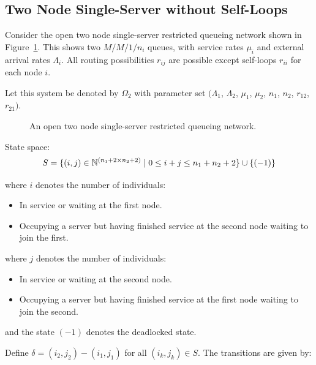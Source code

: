 \documentclass{article}
\begin{document}
\subsection{Two Node Single-Server without Self-Loops}\label{sec:2nodewithoutselfloops}

Consider the open two node single-server restricted queueing network shown in Figure~\ref{fig:queueingnetwork_2nodes}.
This shows two \(M/M/1/n_i\) queues, with service rates $\mu_i$ and external arrival rates $\Lambda_i$.
All routing possibilities $r_{ij}$ are possible except self-loops $r_{ii}$ for each node $i$.

Let this system be denoted by $\Omega_2$ with parameter set $(\Lambda_1$, $\Lambda_2$, $\mu_1$, $\mu_2$, $n_1$, $n_2$, $r_{12}$, $r_{21})$.

\begin{figure}[!htbp]
  \begin{center}
  
  \end{center}
  \caption{An open two node single-server restricted queueing network.}
  \label{fig:queueingnetwork_2nodes}
\end{figure}

State space:
    \[S = \{(i,j)\in\mathbb{N}^{(n_1+2\times n_2+2)} \nonscript\; | \nonscript\; 0 \leq i + j \leq n_1 + n_2 + 2
    \}\cup\{(-1)\}\]

    where \(i\) denotes the number of individuals:
        \begin{itemize}
            \item In service or waiting at the first node.
            \item Occupying a server but having finished service at the
                second node waiting to join the first.
        \end{itemize}
    where \(j\) denotes the number of individuals:
        \begin{itemize}
            \item In service or waiting at the second node.
            \item Occupying a server but having finished service at the
                first node waiting to join the second.
        \end{itemize}
    and the state $(-1)$ denotes the deadlocked state.

Define $\delta = (i_2, j_2) - (i_1, j_1)$ for all $(i_k, j_k) \in S$. The transitions are given by:
\end{document}
